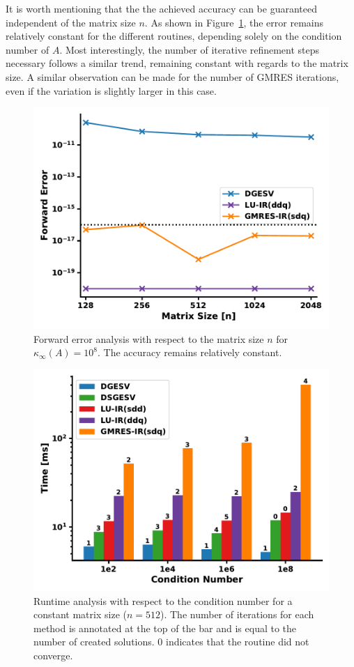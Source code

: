 It is worth mentioning that the the achieved accuracy can be guaranteed independent of the matrix size $n$. As shown in Figure~\hyperref[fig:ir3_n]{\ref{fig:ir3_n}}, the error remains relatively constant for the different routines, depending solely on the condition number of $A$. Most interestingly, the number of iterative refinement steps necessary follows a similar trend, remaining constant with regards to the matrix size. A similar observation can be made for the number of GMRES iterations, even if the variation is slightly larger in this case.

\begin{figure}[h]
    \centering
    \includegraphics[width=0.7\linewidth]{chapters/5_experiments/figures/IR3_n.pdf}
    \caption[IR - Forward Error 2]{Forward error analysis with respect to the matrix size $n$ for $\kappa_\infty(A)=10^8$. The accuracy remains relatively constant.}
    \label{fig:ir3_n}
\end{figure}


\begin{figure}[h]
    \centering
    \includegraphics[width=0.7\linewidth]{chapters/5_experiments/figures/IR3_runtime.pdf}
    \caption[IR - Runtime]{Runtime analysis with respect to the condition number for a constant matrix size ($n=512$). The number of iterations for each method is annotated at the top of the bar and is equal to the number of created solutions. $0$ indicates that the routine did not converge.}
    \label{fig:ir3_time}
\end{figure}

